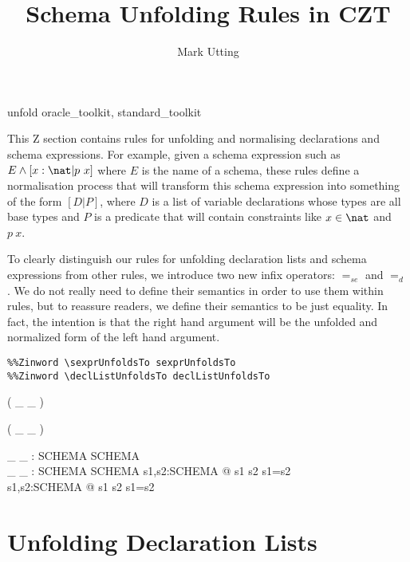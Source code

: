 \documentclass{article}
\title{Schema Unfolding Rules in CZT}
\author{Mark Utting}
\newcommand{\sexprUnfoldsTo}{\mathrel{=_{se}}}
\newcommand{\declListUnfoldsTo}{\mathrel{=_d}}
\begin{document}
\maketitle

\begin{zsection}
  \SECTION unfold \parents oracle\_toolkit, standard\_toolkit
\end{zsection}

This Z section contains rules for unfolding and normalising declarations
and schema expressions.  For example, given a schema expression such as 
$E \land [x:\nat | p~x]$ where $E$ is the name of a schema, these rules
define a normalisation process that will transform this schema expression
into something of the form $[D|P]$, where $D$ is a list of variable
declarations whose types are all base types and $P$ is a predicate that
will contain constraints like $x \in \nat$ and $p~x$.

To clearly distinguish our rules for unfolding declaration lists and
schema expressions from other rules, we introduce two new infix
operators: $\sexprUnfoldsTo$ and $\declListUnfoldsTo$.  
We do not really need to define their semantics in order to use them within
rules, but to reassure readers, we define their semantics to be just
equality.  In fact, the intention is that the right hand argument
will be the unfolded and normalized form of the left hand argument.

\begin{verbatim}
%%Zinword \sexprUnfoldsTo sexprUnfoldsTo
%%Zinword \declListUnfoldsTo declListUnfoldsTo
\end{verbatim}

\begin{zed}
  \relation ( \_ \sexprUnfoldsTo \_ )
\end{zed}
\begin{zed}
  \relation ( \_ \declListUnfoldsTo \_ )
\end{zed}


\begin{gendef}[SCHEMA]
  \_ \sexprUnfoldsTo \_ : SCHEMA \rel SCHEMA \\
  \_ \declListUnfoldsTo \_ : SCHEMA \rel SCHEMA
\where
  \forall s1,s2:SCHEMA @ s1 \sexprUnfoldsTo s2 \iff s1=s2 \\
  \forall s1,s2:SCHEMA @ s1 \declListUnfoldsTo s2 \iff s1=s2 \\
\end{gendef}


\section{Unfolding Declaration Lists}
\end{document}
